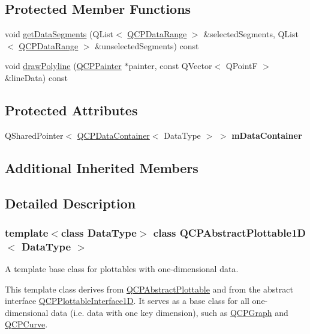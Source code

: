 \subsection*{Protected Member Functions}
\begin{DoxyCompactItemize}
\item 
void \hyperlink{class_q_c_p_abstract_plottable1_d_ae890e62ce403c54f575c73b9529f1af8}{get\+Data\+Segments} (Q\+List$<$ \hyperlink{class_q_c_p_data_range}{Q\+C\+P\+Data\+Range} $>$ \&selected\+Segments, Q\+List$<$ \hyperlink{class_q_c_p_data_range}{Q\+C\+P\+Data\+Range} $>$ \&unselected\+Segments) const
\item 
void \hyperlink{class_q_c_p_abstract_plottable1_d_a7adc6c3cccebb5341f11e0c2b7d54206}{draw\+Polyline} (\hyperlink{class_q_c_p_painter}{Q\+C\+P\+Painter} $\ast$painter, const Q\+Vector$<$ Q\+PointF $>$ \&line\+Data) const
\end{DoxyCompactItemize}
\subsection*{Protected Attributes}
\begin{DoxyCompactItemize}
\item 
\mbox{\label{class_q_c_p_abstract_plottable1_d_ac139cf70590707a1fb40eabe97fac246}} 
Q\+Shared\+Pointer$<$ \hyperlink{class_q_c_p_data_container}{Q\+C\+P\+Data\+Container}$<$ Data\+Type $>$ $>$ {\bfseries m\+Data\+Container}
\end{DoxyCompactItemize}
\subsection*{Additional Inherited Members}


\subsection{Detailed Description}
\subsubsection*{template$<$class Data\+Type$>$\newline
class Q\+C\+P\+Abstract\+Plottable1\+D$<$ Data\+Type $>$}

A template base class for plottables with one-\/dimensional data. 

This template class derives from \hyperlink{class_q_c_p_abstract_plottable}{Q\+C\+P\+Abstract\+Plottable} and from the abstract interface \hyperlink{class_q_c_p_plottable_interface1_d}{Q\+C\+P\+Plottable\+Interface1D}. It serves as a base class for all one-\/dimensional data (i.\+e. data with one key dimension), such as \hyperlink{class_q_c_p_graph}{Q\+C\+P\+Graph} and \hyperlink{class_q_c_p_curve}{Q\+C\+P\+Curve}.

